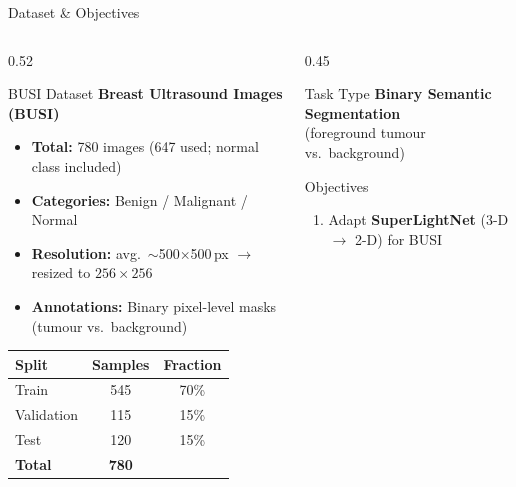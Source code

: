 \documentclass[aspectratio=169,10pt]{beamer}
\begin{document}
\begin{frame}{Dataset \& Objectives}
  \begin{columns}[T]
    \begin{column}{0.52\textwidth}
      \begin{block}{BUSI Dataset \cite{al2020dataset}}
        \textbf{Breast Ultrasound Images (BUSI)}
        \begin{itemize}
          \item \textbf{Total:} 780 images (647 used; normal class included)
          \item \textbf{Categories:} Benign / Malignant / Normal
          \item \textbf{Resolution:} avg.\ $\sim$500$\times$500\,px $\to$ resized to $256\times256$
          \item \textbf{Annotations:} Binary pixel-level masks (tumour vs.\ background)
        \end{itemize}
        \vspace{4pt}
        \begin{center}
        \begin{tabular}{lcc}
          \toprule
          \textbf{Split} & \textbf{Samples} & \textbf{Fraction}\\
          \midrule
          Train      & 545 & 70\%\\
          Validation & 115 & 15\%\\
          Test       & 120 & 15\%\\
          \midrule
          \textbf{Total} & \textbf{780} &\\
          \bottomrule
        \end{tabular}
        \end{center}
      \end{block}
    \end{column}
    \begin{column}{0.45\textwidth}
      \begin{block}{Task Type}
        \textbf{Binary Semantic Segmentation}\\
        (foreground tumour vs.\ background)
      \end{block}
      \vspace{4pt}
      \begin{block}{Objectives}
        \begin{enumerate}
          \item Adapt \textbf{SuperLightNet} (3-D $\to$ 2-D) for BUSI

\end{enumerate}
\end{block}
\end{column}
\end{columns}
\end{frame}
\end{document}
